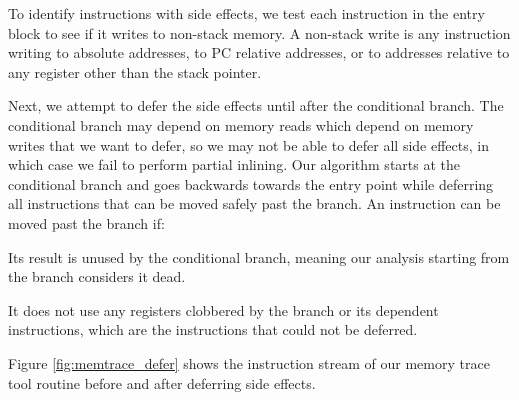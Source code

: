 To identify instructions with side effects, we test each instruction in the
entry block to see if it writes to non-stack memory.  A non-stack write is any
instruction writing to absolute addresses, to PC relative addresses, or to
addresses relative to any register other than the stack pointer.

Next, we attempt to defer the side effects until after the conditional branch.
The conditional branch may depend on memory reads which depend on memory writes
that we want to defer, so we may not be able to defer all side effects, in which
case we fail to perform partial inlining.  Our algorithm starts at the
conditional branch and goes backwards towards the entry point while deferring
all instructions that can be moved safely past the branch.  An instruction can
be moved past the branch if:

\begin{packed_enumerate}
\item Its result is unused by the conditional branch, meaning our analysis
starting from the branch considers it dead.
\item It does not use any registers clobbered by the branch or its dependent
instructions, which are the instructions that could not be deferred.
\end{packed_enumerate}

Figure \ref{fig:memtrace_defer} shows the instruction stream of our memory trace
tool routine before and after deferring side effects.

